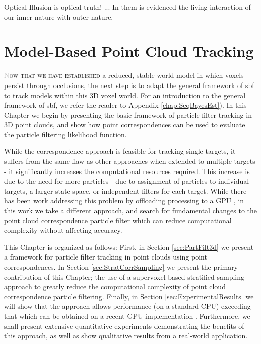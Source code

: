 \begin{savequote}[75mm]
Optical Illusion is optical truth! ... In them is evidenced the living interaction of our inner nature with outer nature.
\end{savequote}

\chapter{Model-Based Point Cloud Tracking}
\label{Chap:ModelBasedTracking}
\lettrine[lines=3, loversize=0.3]{\textcolor{Silver}N}{ow that we have established} a reduced, stable world model in which voxels persist through occlusions, the next step is to adapt the general framework of \gls{sbf} to track models within this 3D voxel world. For an introduction to the general framework of \gls{sbf}, we refer the reader to Appendix \ref{chap:SeqBayesEst}). In this Chapter we begin by presenting the basic framework of particle filter tracking in 3D point clouds, and show how point correspondences can be used to evaluate the particle filtering likelihood function.

While the correspondence approach is feasible for tracking single targets, it suffers from the same flaw as other approaches when extended to multiple targets \cite{MCMCPartFilt_05, ApproxMultiTrack_06,Koo_IROS2013} - it significantly increases the computational resources required. This increase is due to the need for more particles - due to assignment of particles to individual targets, a larger state space, or independent filters for each target. While there has been work addressing this problem by offloading processing to a GPU \cite{Choi_IROS2013}, in this work we take a different approach, and search for fundamental changes to the point cloud correspondence particle filter which can reduce computational complexity without affecting accuracy. 

This Chapter is organized as follows: First, in Section \ref{sec:PartFilt3d} we present a framework for particle filter tracking in point clouds using point correspondences. In Section \ref{sec:StratCorrSampling} we present the primary contribution of this Chapter; the use of a supervoxel-based stratified sampling approach to greatly reduce the computational complexity of point cloud correspondence particle filtering. Finally, in Section \ref{sec:ExperimentalResults} we will show that the approach allows performance (on a standard CPU) exceeding that which can be obtained on a recent GPU implementation \cite{Choi_IROS2013}. Furthermore, we shall present extensive quantitative experiments demonstrating the benefits of this approach, as well as show qualitative results from a real-world application. 

